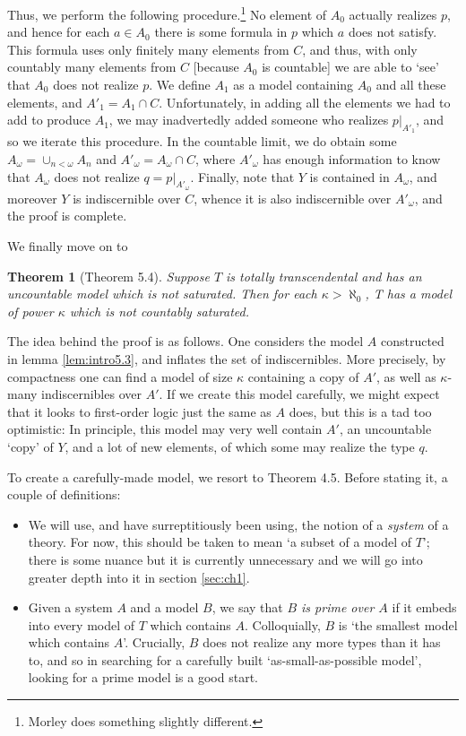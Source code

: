 \documentclass{article}
\newtheorem{theorem}{Theorem}[section]
\theoremstyle{nonumberplain}
\begin{document}
Thus, we perform the following procedure.\footnote{Morley does something slightly different.} No element of $A_0$ actually realizes $p$, and hence for each $a \in A_0$ there is some formula in $p$ which $a$ does not satisfy. This formula uses only finitely many elements from $C$, and thus, with only countably many elements from $C$ [because $A_0$ is countable] we are able to `see' that $A_0$ does not realize $p$. We define $A_1$ as a model containing $A_0$ and all these elements, and $A'_1 = A_1 \cap C$. Unfortunately, in adding all the elements we had to add to produce $A_1$, we may inadvertedly added someone who realizes $p|_{A'_1}$, and so we iterate this procedure. In the countable limit, we do obtain some $A_\omega = \cup_{n < \omega} A_n$ and $A'_\omega = A_\omega \cap C$, where $A'_\omega$ has enough information to know that $A_\omega$ does not realize $q = p|_{A'_\omega}$. Finally, note that $Y$ is contained in $A_\omega$, and moreover $Y$ is indiscernible over $C$, whence it is also indiscernible over $A'_\omega$, and the proof is complete.

We finally move on to
\begin{theorem}[Theorem 5.4]\label{thm:intro5.4}
Suppose $T$ is totally transcendental and has an uncountable model which is not saturated. Then for each $\kappa > \aleph_0$, T has a model of power $\kappa$ which is not countably saturated.
\end{theorem}

The idea behind the proof is as follows. One considers the model $A$ constructed in lemma \ref{lem:intro5.3}, and inflates the set of indiscernibles. More precisely, by compactness one can find a model of size $\kappa$ containing a copy of $A'$, as well as $\kappa$-many indiscernibles over $A'$. If we create this model carefully, we might expect that it looks to first-order logic just the same as $A$ does, but this is a tad too optimistic: In principle, this model may very well contain $A'$, an uncountable `copy' of $Y$, and a lot of new elements, of which some may realize the type $q$.

To create a carefully-made model, we resort to Theorem 4.5. Before stating it, a couple of definitions:
\begin{itemize}
\item We will use, and have surreptitiously been using, the notion of a \emph{system} of a theory. For now, this should be taken to mean `a subset of a model of $T$'; there is some nuance but it is currently unnecessary and we will go into greater depth into it in section \ref{sec:ch1}.
\item Given a system $A$ and a model $B$, we say that \emph{$B$ is prime over $A$} if it embeds into every model of $T$ which contains $A$. Colloquially, $B$ is `the smallest model which contains $A$'. Crucially, $B$ does not realize any more types than it has to, and so in searching for a carefully built `as-small-as-possible model', looking for a prime model is a good start.
\end{itemize}
\end{document}
